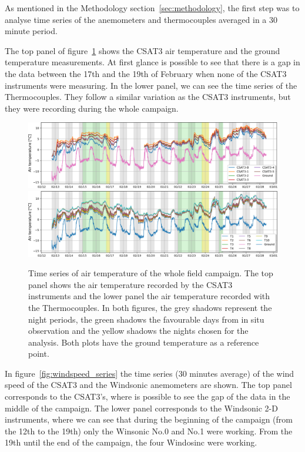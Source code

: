 As mentioned in the Methodology section~\ref{sec:methodology}, the first step was to analyse time series of the anemometers and thermocouples averaged in a 30 minute period. 

The top panel of figure~\ref{fig:temp_series} shows the CSAT3 air temperature and the ground temperature measurements. At first glance is possible to see that there is a gap in the data between the 17th and the 19th of February when none of the CSAT3 instruments were measuring. In the lower panel, we can see the time series of the Thermocouples. They follow a similar variation as the CSAT3 instruments, but they were recording during the whole campaign. 

\begin{figure}
  \centering
  {
  \includegraphics[width=1\textwidth]{fig/chapter_4/csat_temp_series.png}\\
   \includegraphics[width=1\textwidth]{fig/chapter_4/TC_temp_series.png}
   }
  \caption{Time series of air temperature of the whole field campaign. The top panel shows the air temperature recorded by the CSAT3 instruments and the lower panel the air temperature recorded with the Thermocouples. In both figures, the grey shadows represent the night periods, the green shadows the favourable days from in situ observation and the yellow shadows the nights chosen for the analysis. Both plots have the ground temperature as a reference point.}
  \label{fig:temp_series}
\end{figure}

In figure~\ref{fig:windspeed_series} the time series (30 minutes average) of the wind speed of the CSAT3 and the Windsonic anemometers are shown. The top panel corresponds to the CSAT3's, where is possible to see the gap of the data in the middle of the campaign. The lower panel corresponds to the Windsonic 2-D instruments, where we can see that during the beginning of the campaign (from the 12th to the 19th) only the Winsonic No.0 and No.1 were working. From the 19th until the end of the campaign, the four Windosinc were working. 

